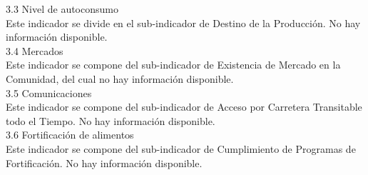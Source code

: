 \newpage
{\Bold\Large 3.3	Nivel de autoconsumo}\\

Este indicador se divide en el sub-indicador de Destino de la Producción. No hay información disponible.\\

{\Bold\Large 3.4	Mercados}\\

Este indicador se compone del sub-indicador de Existencia de Mercado en la Comunidad, del cual no hay información disponible.\\

{\Bold\Large 3.5	Comunicaciones}\\
Este indicador se compone del sub-indicador de Acceso por Carretera Transitable todo el Tiempo. No hay información disponible.\\

{\Bold\Large 3.6	Fortificación de alimentos}\\

Este indicador se compone del sub-indicador de Cumplimiento de Programas de Fortificación. No hay información disponible.\\
